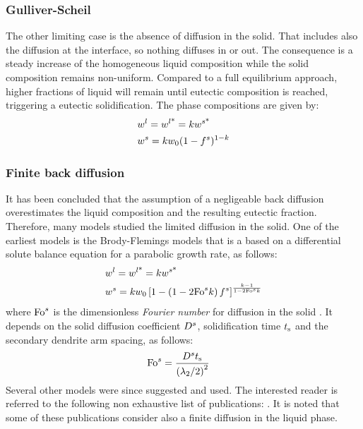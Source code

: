 \subsubsection*{Gulliver-Scheil}
The other limiting case is the absence of diffusion in the solid. That includes also the diffusion at the interface, so nothing diffuses in or out. The consequence is a steady increase of the homogeneous liquid composition while the solid composition remains non-uniform.
Compared to a full equilibrium approach, higher fractions of liquid
will remain until eutectic composition is reached, triggering a eutectic solidification. The phase compositions are given by:
\begin{align}
\label{eq:scheil}
& {w}^l= {w}^{l \text{*}}  = k {w}^{s \text{*}}  \\
& {w}^s= k {w}_0 (1-{f^s})^{1-k}
\end{align}
%
\subsubsection*{Finite back diffusion}
It has been concluded that the assumption of a negligeable back diffusion overestimates the liquid composition
and the resulting eutectic fraction. Therefore, many models studied the limited diffusion in the solid. One of the earliest models is the Brody-Flemings models \citep{khan_influence_2014} that is a based on a differential solute balance equation for a parabolic growth rate, as follows:
\begin{align}
\label{eq:brodyflemings}
& {w}^l= {w}^{l \text{*}}  = k {w}^{s \text{*}}  \\
& {w}^s= k {w}_0 \left[  1 - \left(  1 - 2 \text{Fo}^s k  \right) {f^s}  \right]^{\frac{k-1}{1 - 2 \text{Fo}^s k }}
\end{align}
where $\text{Fo}^s$ is the dimensionless \emph{Fourier number} for diffusion in the solid \citep{dantzig_solidification_2009}. It depends on the 
solid diffusion coefficient $D^s$, solidification time $t_\text{s}$ and the secondary dendrite arm spacing, as follows: 
\begin{align}
\label{eq:fouriersolid}
& \text{Fo}^s = \frac{D^s t_\text{s}}{\left( {\lambda}_{2} / 2 \right)^2}
\end{align}
Several other models were since suggested and used. The interested reader is referred to the following non 
exhaustive list of publications: \citet{clyne_solute_1981,kobayashi_solute_1988,ni_volume-averaged_1991,wang_multiphase_1993,
combeau_modeling_1996,martorano_solutal_2003,tourret_generalized_2009}. It is noted that some of these publications consider 
also a finite diffusion in the liquid phase.
%
%
